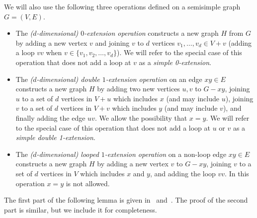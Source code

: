 \documentclass[11pt,a4paper,dvipsnames]{scrartcl}
\begin{document}
\medskip
We will also use the following three operations defined on a semisimple graph $G=(V,E)$.
\begin{itemize}
    \item The \emph{($d$-dimensional) $0$-extension operation} constructs a new graph $H$ from $G$ by adding a new vertex $v$  and joining $v$ to $d$ vertices $v_1, \dots, v_d\in V+v$ (adding a loop $vv$ when $v\in \{v_1,v_2,\ldots,v_d\}$). We will refer to the special case of this operation that does not add a loop at $v$ as a {\em simple 0-extension}.
    \item The \emph{($d$-dimensional) double $1$-extension operation} on an edge $xy\in E$ constructs a new graph $H$ by adding two new vertices $u,v$  to $G-xy$, joining $u$ to a set of $d$ vertices in $V+u$ which includes $x$ (and may include $u$), joining $v$ to a set of $d$ vertices in $V+v$ which includes $y$ (and may include $v$), and finally adding the edge $uv$. We allow the possibility that $x=y$. We will refer to the special case of this operation that does not add a loop at $u$ or $v$ as a {\em simple double 1-extension}.
    \item The \emph{($d$-dimensional) looped $1$-extension operation}
    on a non-loop edge $xy\in E$ 
    constructs a new graph $H$ by adding a new vertex $v$ to $G-xy$, joining $v$ to a set of $d$ vertices in $V$ which includes $x$ and $y$, and adding the loop $vv$. In this operation $x=y$ is not allowed.
\end{itemize}



The first part of the following lemma is given in~\cite[Lemmas 2.3, 4.1]{JJT} and~\cite[Corollary 30]{JJT2}. The proof of the second part is similar, but we include it for completeness.
\end{document}
